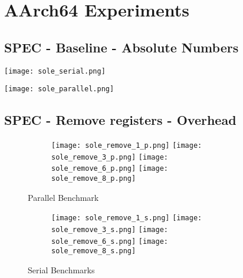 \documentclass[11pt]{article}
\begin{document}
    \section*{AArch64 Experiments}

    \subsection*{SPEC - Baseline - Absolute Numbers}

    \texttt{[image: sole\_serial.png]}\par\vspace{0,5cm}
    \texttt{[image: sole\_parallel.png]}\par\vspace{0,5cm}

    \newpage

    \subsection*{SPEC - Remove registers - Overhead}

    \begin{figure}[ht]
        \begin{subfigure}{\linewidth}
            \texttt{[image: sole\_remove\_1\_p.png]}\hfill
            \texttt{[image: sole\_remove\_3\_p.png]}\hfill
            \texttt{[image: sole\_remove\_6\_p.png]}\hfill
            \texttt{[image: sole\_remove\_8\_p.png]}
            \caption{}
        \end{subfigure}\par\medskip
        \caption{Parallel Benchmark}
        \label{fig:sole_figs_p}
    \end{figure}

    \newpage

    \begin{figure}
        \begin{subfigure}{\linewidth}
            \texttt{[image: sole\_remove\_1\_s.png]}\hfill
            \texttt{[image: sole\_remove\_3\_s.png]}\hfill
            \texttt{[image: sole\_remove\_6\_s.png]}\hfill
            \texttt{[image: sole\_remove\_8\_s.png]}
            \caption{}
        \end{subfigure}
        \caption{Serial Benchmarks}
        \label{fig:sole_figs_s}
    \end{figure}
\end{document}
